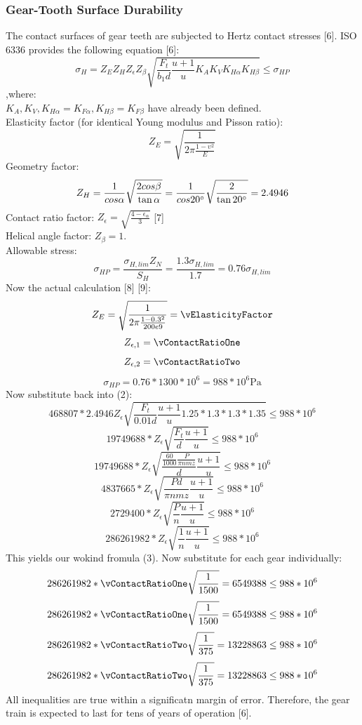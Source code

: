 \documentclass{article}
\begin{document}
\subsubsection{Gear-Tooth Surface Durability}
The contact surfaces of gear teeth are subjected to Hertz contact stresses [6].
ISO 6336 provides the following equation [6]: \\
\begin{equation}\sigma_H = Z_E Z_H Z_\epsilon Z_\beta \sqrt{\frac{F_t}{b_1 d}\frac{u + 1}{u} K_A K_V K_{H\alpha} K_{H\beta}} \leq \sigma_{HP} \end{equation}
,where: \\
$K_A, K_V, K_{H\alpha} = K_{F\alpha}, K_{H\beta} = K_{F\beta}$ have already been defined. \\
Elasticity factor (for identical Young modulus and Pisson ratio):
$$Z_E = \sqrt{\frac{1}{2 \pi \frac{1 - \upsilon^2}{E}}}$$
Geometry factor:
$$ Z_H = \frac{1}{cos \alpha}\sqrt{\frac{2 cos \beta}{\tan \alpha}} =  \frac{1}{cos 20 \degree}\sqrt{\frac{2}{\tan 20 \degree}} = 2.4946$$
Contact ratio factor: $Z_\epsilon = \sqrt{\frac{4 - \epsilon_\alpha}{3}}$ [7]\\
Helical angle factor: $Z_\beta = 1$. \\
Allowable stress:
$$ \sigma_{HP} = \frac{\sigma_{H, lim} Z_N}{S_H} =  \frac{1.3 \sigma_{H, lim}}{1.7} = 0.76\sigma_{H, lim} $$
Now the actual calculation [8] [9]: \\
\FPround{}
$$ Z_E =  \sqrt{\frac{1}{2 \pi \frac{1 - 0.3^2}{200e9}}} = \vElasticityFactor $$
\FPround{}
\FPround{}
$$ Z_{\epsilon, 1} = \vContactRatioOne $$
$$ Z_{\epsilon, 2} = \vContactRatioTwo $$
$$ \sigma_{HP} = 0.76 * 1300 * 10^6 = 988 * 10^6 \si{\pascal}$$
Now substitute back into (2): \\
$$ 468807 * 2.4946 Z_\epsilon \sqrt{\frac{F_t}{0.01 d}\frac{u + 1}{u} 1.25 * 1.3 * 1.3 * 1.35} \leq 988 * 10^6 $$
$$ 19749688 * Z_\epsilon \sqrt{\frac{F_t}{d}\frac{u + 1}{u}} \leq 988 * 10^6 $$
$$ 19749688 * Z_\epsilon \sqrt{\frac{\frac{60}{1000}\frac{P}{\pi n m z}}{d}\frac{u + 1}{u}} \leq 988 * 10^6 $$
$$ 4837665 * Z_\epsilon \sqrt{\frac{Pd}{\pi n m z}\frac{u + 1}{u}} \leq 988 * 10^6 $$
$$ 2729400 * Z_\epsilon \sqrt{\frac{P}{n}\frac{u + 1}{u}} \leq 988 * 10^6 $$
\begin{equation}286261982 * Z_\epsilon \sqrt{\frac{1}{n}\frac{u + 1}{u}} \leq 988 * 10^6  \end{equation}
This yields our wokind fromula (3).
Now substitute for each gear individually:
$$ 286261982 * \vContactRatioOne \sqrt{\frac{1}{1500}} = 6549388 \leq 988 * 10^6  $$
$$ 286261982 * \vContactRatioOne \sqrt{\frac{1}{1500}} = 6549388 \leq 988 * 10^6  $$
$$ 286261982 * \vContactRatioTwo \sqrt{\frac{1}{375}} = 13228863 \leq 988 * 10^6  $$
$$ 286261982 * \vContactRatioTwo \sqrt{\frac{1}{375}} = 13228863 \leq 988 * 10^6  $$
All inequalities are true within a significatn margin of error.
Therefore, the gear train is expected to last for tens of years of operation [6].
\end{document}
